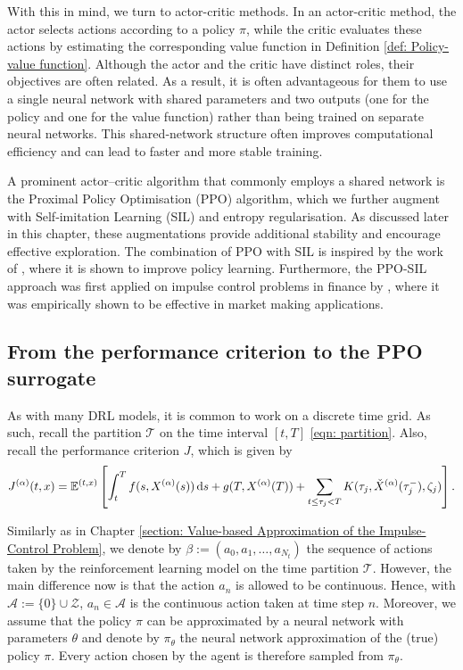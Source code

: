 With this in mind, we turn to actor-critic methods. In an actor-critic method, the actor selects actions according to a policy $\pi$, while the critic evaluates these actions by estimating the corresponding value function in Definition \ref{def: Policy-value function}. Although the actor and the critic have distinct roles, their objectives are often related. As a result, it is often advantageous for them to use a single neural network with shared parameters and two outputs (one for the policy and one for the value function) rather than being trained on separate neural networks. This shared‑network structure often improves computational efficiency and can lead to faster and more stable training. 

A prominent actor–critic algorithm that commonly employs a shared network is the Proximal Policy Optimisation (PPO) algorithm, which we further augment with Self‑imitation Learning (SIL) and entropy regularisation. As discussed later in this chapter, these augmentations provide additional stability and encourage effective exploration. The combination of PPO with SIL is inspired by the work of \textcite{oh2018self}, where it is shown to improve policy learning. Furthermore, the PPO-SIL approach was first applied on impulse control problems in finance by \textcite{jain2025impulse}, where it was empirically shown to be effective in market making applications.

\subsection{From the performance criterion to the PPO surrogate}
As with many DRL models, it is common to work on a discrete time grid. As such, recall the partition $\mathcal{T}$ on the time interval $[t,T]$ \eqref{eqn: partition}. Also, recall the performance criterion $J$, which is given by
\begin{equation*}
    J^{(\alpha)}(t,x) = \mathbb{E}^{(t,x)} \left[ \int_t^T f(s,X^{(\alpha)}(s)) \,\mathrm{d} s + g(T,X^{(\alpha)}(T)) + \sum_{t \leq \tau_j < T} K(\tau_j, \check{X}^{(\alpha)}(\tau_j^-), \zeta_j) \right].
\end{equation*}

Similarly as in Chapter \ref{section: Value-based Approximation of the Impulse-Control Problem}, we denote by $\beta:=(a_0, a_1, \ldots, a_{N_t})$ the sequence of actions taken by the reinforcement learning model on the time partition $\mathcal{T}$. However, the main difference now is that the action $a_n$ is allowed to be continuous. Hence, with $\mathcal{A} := \{0\}\cup \mathcal{Z}$, $a_n \in \mathcal{A}$ is the continuous action taken at time step $n$. Moreover, we assume that the policy $\pi$ can be approximated by a neural network with parameters $\theta$ and denote by $\pi_\theta$ the neural network approximation of the (true) policy $\pi$. Every action chosen by the agent is therefore sampled from $\pi_\theta$. 

